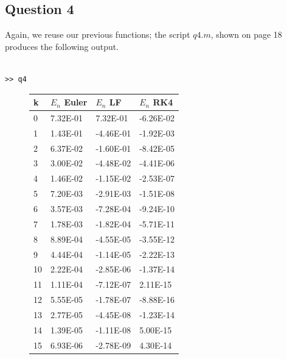 \documentclass[10pt,a4paper]{report}
\begin{document}
\subsection*{Question 4}

Again, we reuse our previous functions; the script $q4.m$, shown on page 18 produces the following output.

\begin{verbatim}

>> q4

\end{verbatim}


\begin{figure}[ht]

\begin{minipage}[b]{0.4\linewidth}
\centering


\begin{table}[H]

\begin{tabular}{|l|l|l|l|}
\hline
k  & $E_n$ Euler & $E_n$ LF     & $E_n$ RK4    \\ \hline
0  & 7.32E-01   & 7.32E-01  & -6.26E-02 \\ \hline
1  & 1.43E-01   & -4.46E-01 & -1.92E-03 \\ \hline
2  & 6.37E-02   & -1.60E-01 & -8.42E-05 \\ \hline
3  & 3.00E-02   & -4.48E-02 & -4.41E-06 \\ \hline
4  & 1.46E-02   & -1.15E-02 & -2.53E-07 \\ \hline
5  & 7.20E-03   & -2.91E-03 & -1.51E-08 \\ \hline
6  & 3.57E-03   & -7.28E-04 & -9.24E-10 \\ \hline
7  & 1.78E-03   & -1.82E-04 & -5.71E-11 \\ \hline
8  & 8.89E-04   & -4.55E-05 & -3.55E-12 \\ \hline
9  & 4.44E-04   & -1.14E-05 & -2.22E-13 \\ \hline
10 & 2.22E-04   & -2.85E-06 & -1.37E-14 \\ \hline
11 & 1.11E-04   & -7.12E-07 & 2.11E-15  \\ \hline
12 & 5.55E-05   & -1.78E-07 & -8.88E-16 \\ \hline
13 & 2.77E-05   & -4.45E-08 & -1.23E-14 \\ \hline
14 & 1.39E-05   & -1.11E-08 & 5.00E-15  \\ \hline
15 & 6.93E-06   & -2.78E-09 & 4.30E-14  \\ \hline
\end{tabular}


\end{table}
\end{minipage}
\end{figure}
\end{document}
